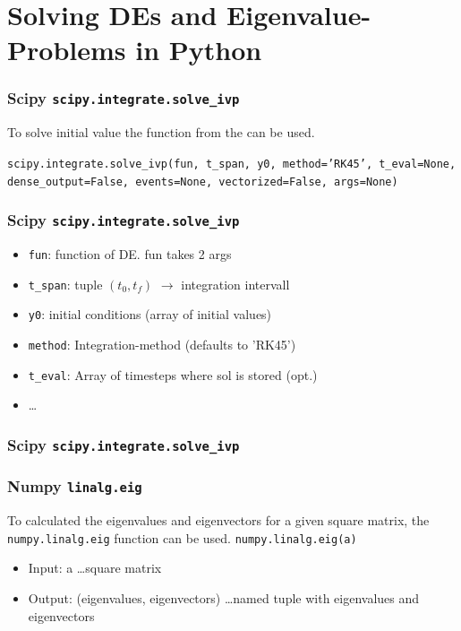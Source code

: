 \documentclass{beamer}
\begin{document}
\section{Solving DEs and Eigenvalue-Problems in Python}
\begin{frame}
  \frametitle{Scipy \texttt{scipy.integrate.solve\_ivp}}
  To solve initial value the  function from the  can be used. 
  
  \texttt{scipy.integrate.solve\_ivp(fun, t\_span, y0, method='RK45', t\_eval=None, dense\_output=False, events=None, vectorized=False, args=None)}

\end{frame}
\begin{frame}
  \frametitle{Scipy \texttt{scipy.integrate.solve\_ivp}}
  \begin{itemize}
    \item \texttt{fun}: function of DE. fun takes 2 args
    \item \texttt{t\_span}: tuple \((t_0, t_f)\) $\rightarrow$ integration intervall
    \item \texttt{y0}: initial conditions (array of initial values)
    \item \texttt{method}: Integration-method (defaults to 'RK45')
    \item \texttt{t\_eval}: Array of timesteps where sol is stored (opt.)
    \item \dots
  \end{itemize}
  
\end{frame}
\begin{frame}
  \frametitle{Scipy \texttt{scipy.integrate.solve\_ivp}}
  
\end{frame}
\begin{frame}
  \frametitle{Numpy \texttt{linalg.eig}}
To calculated the eigenvalues and eigenvectors for a given square matrix, the \texttt{numpy.linalg.eig} function can be used. 
\texttt{numpy.linalg.eig(a)}
\begin{itemize}
  \item Input: a \dots square matrix
  \item Output: (eigenvalues, eigenvectors) \dots named tuple with eigenvalues and eigenvectors
\end{itemize}
\end{frame}
\end{document}
